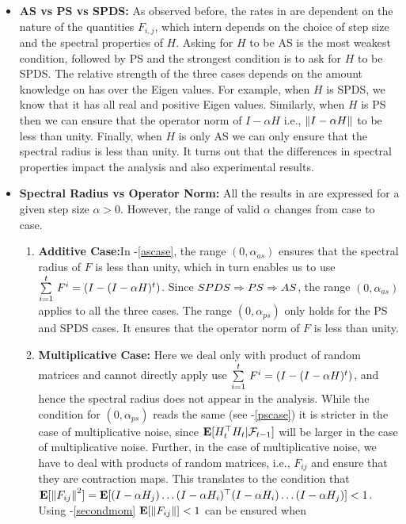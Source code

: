 \begin{itemize}[leftmargin=*]
\item \textbf{AS vs PS vs SPDS:} As observed before, the rates in  are dependent on the nature of the quantities $F_{i,j}$, which intern depends on the choice of step size and the spectral properties of $H$. Asking for $H$ to be AS is the most weakest condition, followed by PS and the strongest condition is to ask for $H$ to be SPDS. The relative strength of the three cases depends on the amount knowledge on has over the Eigen values. For example, when $H$ is SPDS, we know that it has all real and positive Eigen values. Similarly, when $H$ is PS then we can ensure that the operator norm of $I-\alpha H$ i.e., $\norm{I-\alpha H}$ to be less than unity. Finally, when $H$ is only AS we can only ensure that the spectral radius is less than unity. It turns out that the differences in spectral properties impact the analysis and also experimental results.
\item \textbf{Spectral  Radius vs Operator Norm:} All the results in  are expressed for a given step size $\alpha>0$. However, the range of valid $\alpha$ changes from case to case.
\begin{enumerate}
\item \textbf{Additive Case:}In -\ref{ascase}, the range $(0,\alpha_{as})$ ensures that the spectral radius of $F$ is less than unity, which in turn enables us to use $\ous{\sum}{i=1}{t}F^{i}=(I-(I-\alpha H)^t)$. Since $SPDS \Ra PS \Ra AS$, the range $(0,\alpha_{as})$ applies to all the three cases. The range $(0,\alpha_{ps})$ only holds for the PS and SPDS cases. It ensures that the operator norm of $F$ is less than unity.
\item \textbf{Multiplicative Case:} Here we deal only with product of random matrices and cannot directly apply use  $\ous{\sum}{i=1}{t}F^{i}=(I-(I-\alpha H)^t)$, and hence the spectral radius does not appear in the analysis. While the condition for $(0,\alpha_{ps})$ reads the same (see -\ref{pscase}) it is stricter in the case of multiplicative noise, since $\E[H^\top_t H_t|\F_{t-1}]$ will be larger in the case of multiplicative noise.  Further, in the case of multiplicative noise, we have to deal with products of random matrices, i.e., $F_{ij}$ and ensure that they are contraction maps. This translates to the condition that $\E[\norm{F_{ij}}^2]= \E[(I-\alpha H_j)\ldots (I-\alpha H_i)^\top (I-\alpha H_i) \ldots (I-\alpha H_j)]<1$. Using -\ref{secondmom}  $\E[\norm{F_{ij}}]<1$ can be ensured when
\begin{align}\label{mulcond}

\end{align}
\end{enumerate}
\end{itemize}
